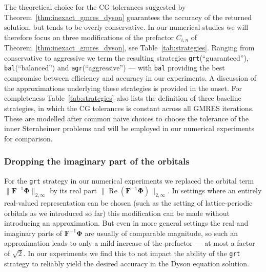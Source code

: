 \documentclass[hidelinks,onefignum,onetabnum]{siamart250211}
\newcommand{\Real}{\operatorname{Re}}
\newcommand{\sbal}{\texttt{bal}\xspace}
\newcommand{\sagr}{\texttt{agr}\xspace}
\newcommand{\sgrt}{\texttt{grt}\xspace}
\begin{document}
The theoretical choice for the CG tolerances
suggested by Theorem~\ref{thm:inexact_gmres_dyson}
guarantees the accuracy of the returned solution,
but tends to be overly conservative.
In our numerical studies we will therefore focus on three modifications
of the prefactor $C_{i,n}$ of Theorem~\ref{thm:inexact_gmres_dyson},
see Table~\ref{tab:strategies}.
Ranging from conservative to aggressive we term the resulting strategies
\sgrt (``guaranteed''), \sbal (``balanced'') and \sagr (``aggressive'')
--- with \sbal providing the best compromise
between efficiency and accuracy in our experiments.
A discussion of the approximations underlying these strategies
is provided in the onset.
%
For completeness Table~\ref{tab:strategies} also lists the definition of three
baseline strategies, %
in which the CG tolerances is constant across all GMRES iterations.
These are modelled after common naive choices to choose the tolerance
of the inner Sternheimer problems and will be employed
in our numerical experiments for comparison.

\subsubsection{Dropping the imaginary part of the orbitals}\label{sec:approx_real}
For the \sgrt strategy in our numerical experiments we replaced
the orbital term $\|\bm{F}^{-1}\bm{\Phi}\|_{2,\infty}$ by its real part
$\|\Real(\bm{F}^{-1}\bm{\Phi})\|_{2,\infty}$.
In settings where an entirely real-valued representation can be chosen
(such as the setting of lattice-periodic orbitals as we introduced so far)
this modification can be made without introducing an approximation.
But even in more general settings the real and imaginary parts of $\bm{F}^{-1}\bm{\Phi}$
are usually of comparable magnitude, so such an approximation leads
to only a mild increase of the prefactor --- at most a factor of $\sqrt{2}$.
In our experiments we find this to not impact the ability of the \sgrt
strategy to reliably yield the desired accuracy in the Dyson equation solution.
%
%
\end{document}
